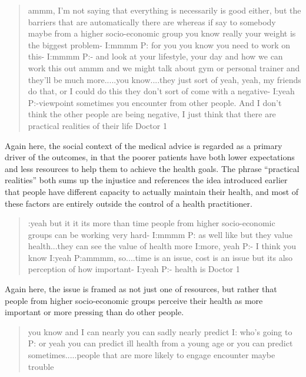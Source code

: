 \begin{quotation}

ammm, I'm not saying that everything is necessarily is good either, but the barriers that are automatically there are whereas if say to somebody maybe from a higher socio-economic group you know really your weight is the biggest problem-
I:mmmm
P: for you you know you need to work on this-
I:mmmm
P:- and look at your lifestyle, your day and how we can work this out ammm and we might talk about gym or personal trainer and they'll be much more.....you know....they just sort of yeah, yeah, my friends do that, or I could do this they don't sort of come with a negative-
I:yeah
P:-viewpoint sometimes you encounter from other people. And I don't think the other people are being negative, I just think that there are practical realities of their life
Doctor 1
\end{quotation}

Again here, the social context of the medical advice is regarded as a primary driver of the outcomes, in that the poorer patients have both lower expectations and less resources to help them to achieve the health goals. The phrase ``practical realities'' both sums up the injustice and references the idea introduced earlier that people have different capacity to actually maintain their health, and most of these factors are entirely outside the control of a health practitioner. 

\begin{quotation}
  :yeah but it it its more than time people from higher socio-economic groups can be working very hard-
I:mmmm
P: as well like but they value health...they can see the value of health more
I:more, yeah
P:- I think you know
I:yeah
P:ammmm, so....time is an issue, cost is an issue but its also perception of how important-
I:yeah
P:- health is
Doctor 1
\end{quotation}

Again here, the issue is framed as not just one of resources, but rather that people from higher socio-economic groups perceive their health as more important or more pressing than do other people. 


\begin{quotation}
  you know and I can nearly you can sadly nearly predict 
I: who's going to
P: or yeah you can predict ill health from a young age or you can predict sometimes.....people that are more likely to engage encounter maybe trouble

\end{quotation}

